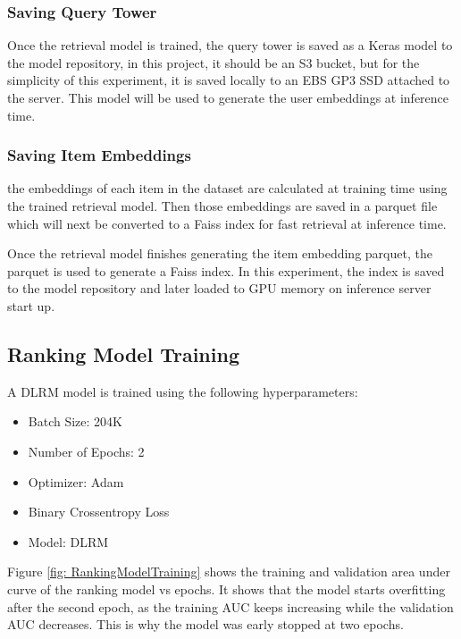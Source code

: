 \subsubsection{Saving Query Tower}

Once the retrieval model is trained, the query tower is saved as a Keras model to the model repository, 
in this project, it should be an S3 bucket, but for the simplicity of this experiment, it is saved locally to an EBS GP3 SSD attached to the server.
This model will be used to generate the user embeddings at inference time.

\subsubsection{Saving Item Embeddings}

the embeddings of each item in the dataset are calculated at training time using the trained retrieval model. 
Then those embeddings are saved in a parquet \cite{ApacheParquet} file which will next be converted to a Faiss \cite{Faiss} index for fast retrieval at inference time.

Once the retrieval model finishes generating the item embedding parquet,
the parquet is used to generate a Faiss \cite{Faiss} index.
In this experiment, the index is saved to the model repository and later loaded to GPU memory on inference server start up.

\subsection{Ranking Model Training}

A DLRM model is trained using the following hyperparameters:

\begin{itemize}
\item Batch Size: 204K
\item Number of Epochs: 2
\item Optimizer: Adam
\item Binary Crossentropy Loss
\item Model: DLRM
\end{itemize}

Figure \ref{fig: RankingModelTraining} shows the training and validation area under curve of the ranking model vs epochs. It shows that the model starts overfitting after the second epoch, as the training AUC keeps increasing while the validation AUC decreases.
This is why the model was early stopped at two epochs.

